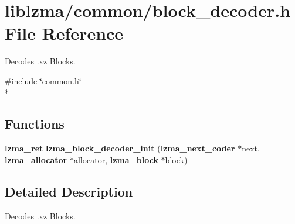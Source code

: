 \section{liblzma/common/block\-\_\-decoder.h File Reference}
\label{block__decoder_8h}


Decodes .xz Blocks.  


{\ttfamily \#include \char`\"{}common.\-h\char`\"{}}\\*
\subsection*{Functions}
\begin{DoxyCompactItemize}
\item 
{\bf lzma\-\_\-ret} {\bfseries lzma\-\_\-block\-\_\-decoder\-\_\-init} ({\bf lzma\-\_\-next\-\_\-coder} $\ast$next, {\bf lzma\-\_\-allocator} $\ast$allocator, {\bf lzma\-\_\-block} $\ast$block)\label{block__decoder_8h_a3a424cc698e5e5421d27333b2f096840}

\end{DoxyCompactItemize}


\subsection{Detailed Description}
Decodes .xz Blocks. 